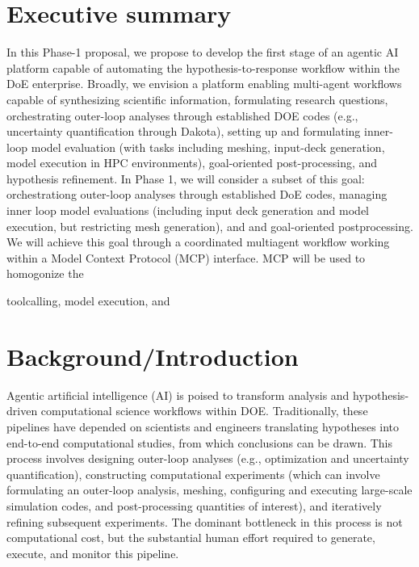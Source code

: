 \documentclass[11pt]{article} \usepackage[margin=1in]{geometry}
\begin{document}
\clearpage {}


\section{Executive summary} In this Phase-1 proposal, we propose to develop the
first stage of an agentic AI platform capable of automating the
hypothesis-to-response workflow within the DoE enterprise. Broadly, we envision
a platform enabling multi-agent workflows capable of synthesizing scientific
information, formulating research questions, orchestrating outer-loop analyses
through established DOE codes (e.g., uncertainty quantification through Dakota),
setting up and formulating inner-loop model evaluation (with tasks including
meshing, input-deck generation, model execution in HPC environments),
goal-oriented post-processing, and hypothesis refinement. In Phase 1, we will
consider a subset of this goal: orchestrationg outer-loop analyses through
established DoE codes, managing inner loop model evaluations (including input
deck generation and model execution, but restricting mesh generation), and and
goal-oriented postprocessing. We will achieve this goal through a coordinated
multiagent workflow working within a Model Context Protocol (MCP) interface. MCP
will be used to homogonize the 

toolcalling, model execution, and 

\section{Background/Introduction} Agentic
artificial intelligence (AI) is poised to transform analysis and
hypothesis-driven computational science workflows within DOE.
Traditionally, these pipelines have depended on
scientists and engineers translating hypotheses into end-to-end computational
studies, from which conclusions can be drawn. This process involves designing outer-loop analyses (e.g.,
optimization and uncertainty quantification), constructing computational
experiments (which can involve formulating an outer-loop analysis, meshing, configuring and executing large-scale simulation codes,
and post-processing quantities of interest), and iteratively refining subsequent
experiments. The dominant bottleneck in this process is not computational cost,
but the substantial human effort required to generate, execute, and monitor this
pipeline.
\end{document}
